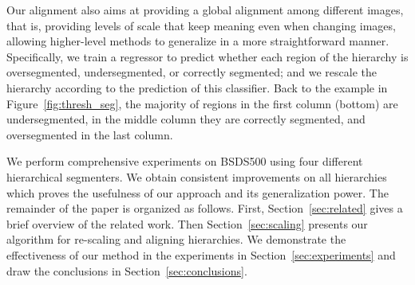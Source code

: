 Our alignment also aims at providing a global alignment among different images, that is, providing levels 
of scale that keep meaning even when changing images, allowing higher-level methods to generalize in a more straightforward manner.
Specifically, we train a regressor to predict whether each region of the hierarchy is oversegmented, undersegmented, or correctly segmented; and we rescale the hierarchy according to the prediction 
of this classifier.
Back to the example in Figure~\ref{fig:thresh_seg}, the majority of regions in the first column (bottom) 
are undersegmented, in the middle column they are correctly segmented, and oversegmented in the last column.

We perform comprehensive experiments on BSDS500 using four different hierarchical segmenters.
We obtain consistent improvements on all hierarchies which proves the usefulness of our approach and its 
generalization power.
The remainder of the paper is organized as follows.
First, Section~\ref{sec:related} gives a brief overview of the related work.
Then Section~\ref{sec:scaling} presents our algorithm for re-scaling and aligning hierarchies.
We demonstrate the effectiveness of our method in the experiments in Section~\ref{sec:experiments} and draw 
the conclusions in Section~\ref{sec:conclusions}.
 

